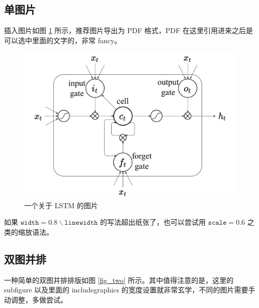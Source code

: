 \documentclass[12]{ctexart}
\begin{document}
\subsection{单图片}

插入图片如图 \ref{fig_lstm} 所示，推荐图片导出为 PDF 格式，PDF 在这里引用进来之后是可以选中里面的文字的，非常 fancy。

\begin{figure}[h!tbp]
    \centering
    \includegraphics[width=0.8\linewidth]{imgs/lstmCell.pdf}
    \caption{一个关于 LSTM 的图片}
    \label{fig_lstm}
\end{figure}

如果 $\mathtt{width=0.8 \backslash linewidth}$ 的写法超出纸张了，也可以尝试用 $\mathtt{scale=0.6}$ 之类的缩放语法。

\subsection{双图并排}

一种简单的双图并排排版如图 \ref{fig_two} 所示。其中值得注意的是，这里的 subfigure 以及里面的 includegraphics 的宽度设置就非常玄学，不同的图片需要手动调整，多做尝试。
\end{document}
